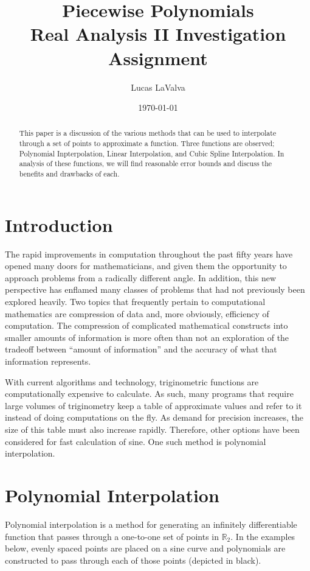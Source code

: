 \documentclass{article}
\title{Piecewise Polynomials \\
    {\large Real Analysis II Investigation Assignment}}
\author{Lucas LaValva}
\date{\today}
\begin{document}
\maketitle

\doublespacing

\begin{abstract}
    This paper is a discussion of the various methods that can be used to interpolate through a set of points to approximate a function. Three functions are observed; Polynomial Inpterpolation, Linear Interpolation, and Cubic Spline Interpolation. In analysis of these functions, we will find reasonable error bounds and discuss the benefits and drawbacks of each.
\end{abstract}

\section{Introduction}

The rapid improvements in computation throughout the past fifty years have opened many doors for mathematicians, and given them the opportunity to approach problems from a radically different angle. In addition, this new perspective has enflamed many classes of problems that had not previously been explored heavily. Two topics that frequently pertain to computational mathematics are compression of data and, more obviously, efficiency of computation. The compression of complicated mathematical constructs into smaller amounts of information is more often than not an exploration of the tradeoff between ``amount of information'' and the accuracy of what that information represents.

With current algorithms and technology, triginometric functions are computationally expensive to calculate. As such, many programs that require large volumes of triginometry keep a table of approximate values and refer to it instead of doing computations on the fly. As demand for precision increases, the size of this table must also increase rapidly. Therefore, other options have been considered for fast calculation of sine. One such method is polynomial interpolation.

\section{Polynomial Interpolation}
\label{section:polynomial_interpolation}

Polynomial interpolation \cite{enwiki:polynomial_interpolation} is a method for generating an infinitely differentiable function that passes through a one-to-one set of points in $\mathbb{R}_2$. In the examples below, evenly spaced points are placed on a sine curve and polynomials are constructed to pass through each of those points (depicted in black).
\end{document}
